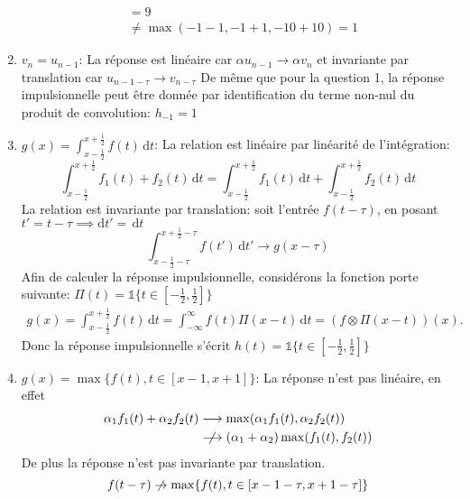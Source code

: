 \documentclass[12pt]{article}
\begin{document}
\begin{enumerate}
\begin{equation*}
\begin{split}
			&= 9 \\
			&\neq \max(-1-1, -1+1, -10 + 10) = 1
\end{split}
\end{equation*}
\item $v_n = u_{n-1}$: \newline
La réponse est linéaire car $\alpha u_{n-1} \rightarrow \alpha v_n$ et invariante par translation \newline car $u_{n-1-\tau} \rightarrow v_{n-\tau}$ \newline
De même que pour la question 1, la réponse impulsionnelle peut être donnée par identification du terme non-nul du produit de convolution: $h_{-1} = 1$
\item $g(x) = \int_{x-\frac{1}{2}}^{x+\frac{1}{2}} f(t) \,\mathrm{d}t$: \newline
La relation est linéaire par linéarité de l'intégration: $$\int_{x-\frac{1}{2}}^{x+\frac{1}{2}} f_1(t) + f_2(t) \,\mathrm{d}t = \int_{x-\frac{1}{2}}^{x+\frac{1}{2}} f_1(t) \,\mathrm{d}t+ \int_{x-\frac{1}{2}}^{x+\frac{1}{2}} f_2(t) \,\mathrm{d}t$$ \newline
La relation est invariante par translation: soit l'entrée $f(t-\tau)$, \newline en posant $t' = t -\tau \implies \mathrm{d}t' = \,\mathrm{d}t $ $$\int_{x-\frac{1}{2}-\tau}^{x+\frac{1}{2}-\tau} f(t')\,\mathrm{d}t' \rightarrow g(x-\tau)$$
Afin de calculer la réponse impulsionnelle, considérons la fonction porte suivante: $\Pi(t) = \mathds{1}\{t \in {[{-\frac{1}{2}}, \frac{1}{2}]}\}$ \newline
\begin{equation*}\begin{split}
g(x) = \int_{x-\frac{1}{2}}^{x+\frac{1}{2}} f(t) \,\mathrm{d}t = \int_{-\infty}^{\infty} f(t) \Pi(x-t) \,\mathrm{d}t = (f \otimes \Pi(x-t))(x).
\end{split}\end{equation*}
Donc la réponse impulsionnelle s'écrit $h(t) = \mathds{1}\{t\in {[{-\frac{1}{2}}, \frac{1}{2}]}\}$
\item $g(x) = \max\{f(t), t \in {[x-1, x+1]}\}$: \newline
La réponse n'est pas linéaire, en effet 
\begin{equation*}\begin{split}
\alpha_1 f_1(t) + \alpha_2 f_2(t) & \longrightarrow \max(\alpha_1 f_1(t), \alpha_2 f_2(t)) \\
								  & \centernot\longrightarrow (\alpha_1 + \alpha_2) \max(f_1(t),f_2(t))
\end{split}\end{equation*}
De plus la réponse n'est pas invariante par translation.\newline
$$f(t-\tau) \centernot\rightarrow \max\{f(t), t \in {[x-1-\tau, x+1-\tau]}\}  $$
\end{enumerate}
\end{document}
